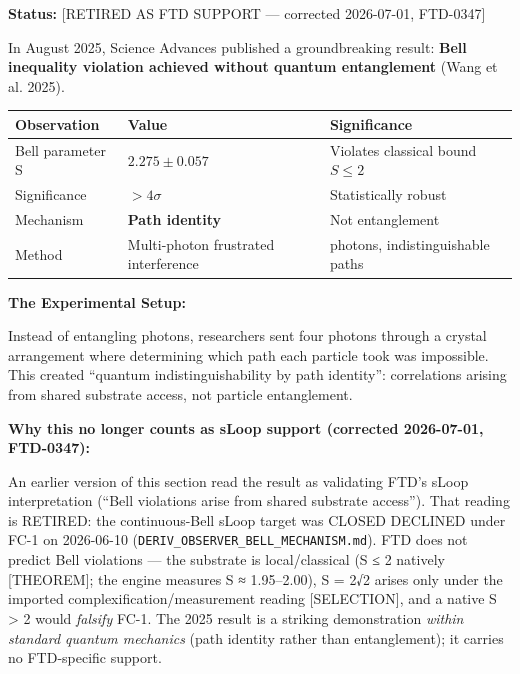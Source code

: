 \documentclass[
  11pt,
  letterpaper,
  twoside,
  openany]{book}
\begin{document}
\textbf{Status:} {[}RETIRED AS FTD SUPPORT --- corrected 2026-07-01,
FTD-0347{]}

In August 2025, Science Advances published a groundbreaking result:
\textbf{Bell inequality violation achieved without quantum entanglement}
(Wang et al. 2025).

\begin{longtable}[]{@{}
  >{\raggedright\arraybackslash}p{}
  >{\raggedright\arraybackslash}p{}
  >{\raggedright\arraybackslash}p{}@{}}
\toprule\noalign{}
\begin{minipage}[b]{\linewidth}\raggedright
Observation
\end{minipage} & \begin{minipage}[b]{\linewidth}\raggedright
Value
\end{minipage} & \begin{minipage}[b]{\linewidth}\raggedright
Significance
\end{minipage} \\
\midrule\noalign{}
\endhead
\bottomrule\noalign{}
\endlastfoot
Bell parameter S & \(2.275 \pm 0.057\) & Violates classical bound
\(S \leq 2\) \\
Significance & \textbf{\(> 4\sigma\)} & Statistically robust \\
Mechanism & \textbf{Path identity} & Not entanglement \\
Method & Multi-photon frustrated interference & 4 photons,
indistinguishable paths \\
\end{longtable}

\textbf{The Experimental Setup:}

Instead of entangling photons, researchers sent four photons through a
crystal arrangement where determining which path each particle took was
impossible. This created ``quantum indistinguishability by path
identity'': correlations arising from shared substrate access, not
particle entanglement.

\textbf{Why this no longer counts as sLoop support (corrected
2026-07-01, FTD-0347):}

An earlier version of this section read the result as validating FTD's
sLoop interpretation (``Bell violations arise from shared substrate
access''). That reading is RETIRED: the continuous-Bell sLoop target was
CLOSED DECLINED under FC-1 on 2026-06-10
(\texttt{DERIV\_OBSERVER\_BELL\_MECHANISM.md}). FTD does not predict
Bell violations --- the substrate is local/classical (S ≤ 2 natively
{[}THEOREM{]}; the engine measures S ≈ 1.95--2.00), S = 2√2 arises only
under the imported complexification/measurement reading {[}SELECTION{]},
and a native S \textgreater{} 2 would \emph{falsify} FC-1. The 2025
result is a striking demonstration \emph{within standard quantum
mechanics} (path identity rather than entanglement); it carries no
FTD-specific support.
\end{document}
